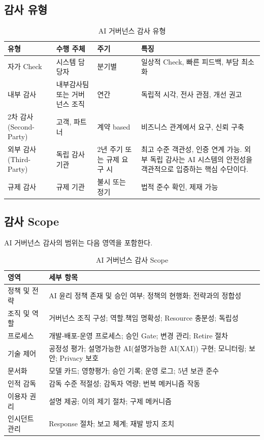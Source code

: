 \subsection{감사 유형}
\label{sec:11.1.2}

\begin{table}[htbp]
\centering
\caption{AI 거버넌스 감사 유형}
\label{tab:audit_types}
\begin{tabularx}{\textwidth}{p{2.5cm}p{2cm}p{2.5cm}X}
\toprule
\textbf{유형} & \textbf{수행 주체} & \textbf{주기} & \textbf{특징} \\
\midrule
자가 Check & 
시스템 담당자 & 
분기별 & 
일상적 Check, 빠른 피드백, 부담 최소화 \\
\midrule
내부 감사 & 
내부감사팀 또는 거버넌스 조직 & 
연간 & 
독립적 시각, 전사 관점, 개선 권고 \\
\midrule
2차 감사 (Second-Party) & 
고객, 파트너 & 
계약 based & 
비즈니스 관계에서 요구, 신뢰 구축 \\
\midrule
외부 감사 (Third-Party) & 
독립 감사 기관 & 
2년 주기 또는 규제 요구 시 & 
최고 수준 객관성, 인증 연계 가능. 외부 독립 감사는 AI 시스템의 안전성을 객관적으로 입증하는 핵심 수단이다.\cite{falco2021governing} \\
\midrule
규제 감사 & 
규제 기관 & 
불시 또는 정기 & 
법적 준수 확인, 제재 가능 \\
\bottomrule
\end{tabularx}
\end{table}


\subsection{감사 Scope}
\label{sec:11.1.3}

AI 거버넌스 감사의 범위는 다음 영역을 포함한다.

\begin{table}[htbp]
\centering
\caption{AI 거버넌스 감사 Scope}
\label{tab:audit_scope}
\begin{tabularx}{\textwidth}{p{3cm}X}
\toprule
\textbf{영역} & \textbf{세부 항목} \\
\midrule
정책 및 전략 & 
AI 윤리 정책 존재 및 승인 여부; 정책의 현행화; 
전략과의 정합성 \\
\midrule
조직 및 역할 & 
거버넌스 조직 구성; 역할.책임 명확성; 
Resource 충분성; 독립성 \\
\midrule
프로세스 & 
개발-배포-운영 프로세스; 승인 Gate; 
변경 관리; Retire 절차 \\
\midrule
기술 제어 & 
공정성\cite{bellamy2019ai} 평가; 설명가능한 AI(설명가능한 AI(XAI)) 구현; 모니터링\cite{klaise2021monitoring}; 
보안; Privacy 보호 \\
\midrule
문서화 & 
모델 카드; 영향평가; 승인 기록; 
운영 로그; 5년 보관 준수 \\
\midrule
인적 감독 & 
감독 수준 적절성; 감독자 역량; 
번복 메커니즘 작동 \\
\midrule
이용자 권리 & 
설명 제공; 이의 제기 절차; 
구제 메커니즘 \\
\midrule
인시던트 관리 & 
Response 절차; 보고 체계; 
재발 방지 조치 \\
\bottomrule
\end{tabularx}
\end{table}


